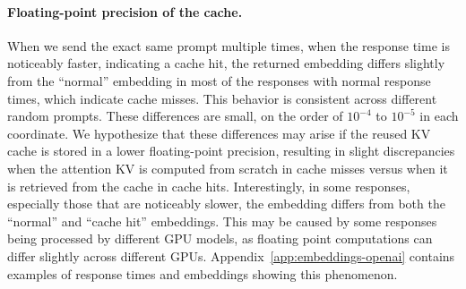 \paragraph{Floating-point precision of the cache.}
When we send the exact same prompt multiple times, when the response time is noticeably faster, indicating a cache hit, the returned embedding differs slightly from the ``normal'' embedding in most of the responses with normal response times, which indicate cache misses. This behavior is consistent across different random prompts. These differences are small, on the order of $10^{-4}$ to $10^{-5}$ in each coordinate. We hypothesize that these differences may arise if the reused KV cache is stored in a lower floating-point precision, resulting in slight discrepancies when the attention KV is computed from scratch in cache misses versus when it is retrieved from the cache in cache hits. Interestingly, in some responses, especially those that are noticeably slower, the embedding differs from both the ``normal'' and ``cache hit'' embeddings. This may be caused by some responses being processed by different GPU models, as floating point computations can differ slightly across different GPUs. Appendix~\ref{app:embeddings-openai} contains examples of response times and embeddings showing this phenomenon.

